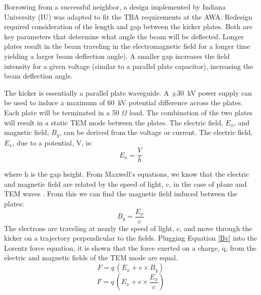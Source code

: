 Borrowing from a successful neighbor, a design implemented by Indiana University (IU) \cite{iukicker}
was adapted to fit the TBA requirements at the AWA. Redesign required consideration
of the length and gap between the kicker plates. Both are key parameters that determine 
what angle the beam will be deflected. Longer plates result in the beam traveling 
in the electromagnetic field for a longer time yielding a larger beam deflection angle). 
A smaller gap increases the field intensity for a given voltage (similar to a parallel plate 
capacitor), increasing the beam deflection angle. 


The kicker is essentially a parallel plate waveguide. 
A $\pm$\SI{30}{kV} power supply can be used to induce a maximum of \SI{60}{kV} potential difference 
across the plates. Each plate will be terminated in a 50 $\Omega$ load.  
The combination of the two plates will result in a static TEM mode 
between the plates. The electric field, $E_x$, and magnetic field, $B_y$,
can be derived from the voltage or current. The electric field, $E_x$, due to a potential, V, is: 
\begin{equation}
E_x=\frac{V}{h}
\end{equation}

where h is the gap height. From Maxwell's equations, we know that the electric and magnetic 
field are related by the speed of light, c, in the case of plane and TEM waves \cite{pozar}. 
From this we can find the magnetic field induced between the plates: 
\begin{equation}
B_y=\frac{E_x}{c}
\end{equation}\label{Bv}
The electrons are traveling at nearly the speed of light, $c$, and move through the kicker on a 
trajectory perpendicular to the fields.  Plugging Equation \ref{Bv} into the Lorentz force equation, 
it is shown that the force exerted on a charge, q, 
from the electric and magnetic fields of the TEM mode are equal. 
\begin{equation}
F=q\,(E_x+v\times B_y)
\end{equation}
\begin{equation}
	F = q \,\left(E_x+c\times \frac{E_x}{c}\right)
\end{equation}

